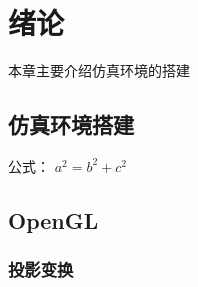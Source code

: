 \chapter{绪论}

本章主要介绍仿真环境的搭建

\section{仿真环境搭建}

公式：
$a^2=b^2+c^2$


\section{OpenGL}

\subsection{投影变换}